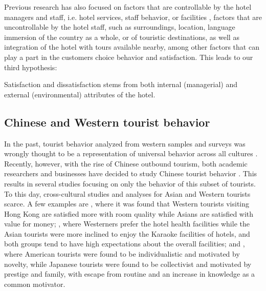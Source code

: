 Previous research has also focused on factors that are controllable by the hotel managers and staff, i.e. hotel services, staff behavior, or facilities \cite[e.g.][]{shanka2004, choi2001}, \DIFdelbegin {}\DIFdelend \DIFaddbegin {}\DIFaddend factors that are uncontrollable by the hotel staff, such as surroundings, location, language immersion of the country as a whole, or of touristic destinations, as well as integration of the hotel with tours available nearby, among other factors that can play a part in the customers choice behavior and satisfaction. 
This leads to our third hypothesis:

\begin{hyp}
\label{hyp:3}
Satisfaction and dissatisfaction stems from both internal (managerial) and external (environmental) attributes of the hotel.
\end{hyp}

\subsection{Chinese and Western tourist behavior}\label{theory_zh_en}

In the past, tourist behavior analyzed from western samples and surveys was wrongly thought to be a representation of universal behavior across all cultures \cite[][]{nielsen2017, jones2010WEIRD, guaratne2009, hogan1978biases}. Recently, however, with the rise of Chinese outbound tourism, both academic researchers and businesses have decided to study Chinese tourist behavior \cite[][]{sun2017}. This results in several studies focusing on only the behavior of this subset of tourists. To this day, cross-cultural studies and analyses for Asian and Western tourists \DIFdelbegin {}\DIFdelend \DIFaddbegin {}\DIFaddend scarce. A few examples are \cite{choi2000}, where it was found that Western tourists visiting Hong Kong are satisfied more with room quality while Asians are satisfied with value for money; \cite{bauer1993changing}, where Westerners prefer the hotel health facilities while the Asian tourists were more inclined to enjoy the Karaoke facilities of hotels, and both groups tend to have high expectations about the overall facilities; and \cite{kim2000}, where American tourists were found to be individualistic and motivated by novelty, while Japanese tourists were found to be collectivist and motivated by prestige and family, with escape from routine and an increase in knowledge as a common motivator. 

